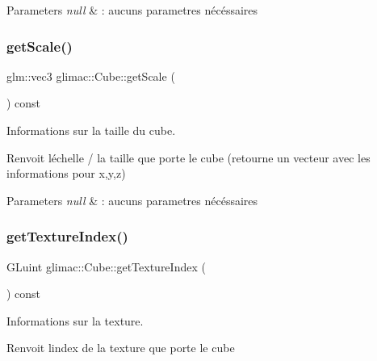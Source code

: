 \begin{DoxyParams}{Parameters}
{\em null} & \+: aucuns parametres nécéssaires \\
\hline
\end{DoxyParams}
\mbox{\label{classglimac_1_1Cube_a8364cfaa27d1414f102248c420ea962a}} 
\subsubsection{\texorpdfstring{get\+Scale()}{getScale()}}
{\footnotesize\ttfamily glm\+::vec3 glimac\+::\+Cube\+::get\+Scale (\begin{DoxyParamCaption}{ }\end{DoxyParamCaption}) const\hspace{0.3cm}{\ttfamily [inline]}}



Informations sur la taille du cube. 

Renvoit l\textquotesingle{}échelle / la taille que porte le cube (retourne un vecteur avec les informations pour x,y,z)


\begin{DoxyParams}{Parameters}
{\em null} & \+: aucuns parametres nécéssaires \\
\hline
\end{DoxyParams}
\mbox{\label{classglimac_1_1Cube_abc2b501d1c7d60770ebcd707c001635b}} 
\subsubsection{\texorpdfstring{get\+Texture\+Index()}{getTextureIndex()}}
{\footnotesize\ttfamily G\+Luint glimac\+::\+Cube\+::get\+Texture\+Index (\begin{DoxyParamCaption}{ }\end{DoxyParamCaption}) const\hspace{0.3cm}{\ttfamily [inline]}}



Informations sur la texture. 

Renvoit l\textquotesingle{}index de la texture que porte le cube


